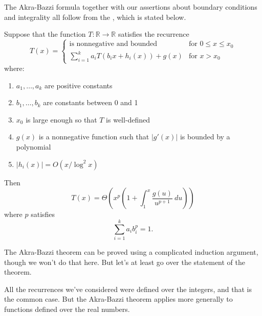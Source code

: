 The Akra-Bazzi formula together with our assertions about boundary
conditions and integrality all follow from the
, which is stated below.

\begin{theorem}
\label{th:akra-bazzi}
Suppose that the function $T: \mathbb{R} \to\mathbb{R}$ satisfies
the recurrence
\begin{equation*}
T(x) =
\begin{cases}
\text{is nonnegative and bounded} & \text{for $0 \leq x \leq x_0$} \\
\sum\limits_{i=1}^k a_i T(b_i x + h_i(x)) + g(x) & \text{for $x > x_0$}
\end{cases}
\end{equation*}
where:
\begin{enumerate}
\item $a_1, \ldots, a_k$ are positive constants
\item $b_1, \ldots, b_k$ are constants between 0 and 1
\item $x_0$ is large enough so that $T$ is well-defined
\item $g(x)$ is a nonnegative function such that $|g'(x)|$ is bounded
by a polynomial
\item $|h_i(x)| = O(x / \log^2 x)$
\end{enumerate}
Then
\begin{equation*}
T(x) = \Theta\left(x^p \left(1 + \int_1^x \frac{g(u)}{u^{p+1}} \
    du\right) \right)
\end{equation*}
where $p$ satisfies
\begin{equation*}
\sum_{i=1}^k {a_i b_i^p} = 1.
\end{equation*}
\end{theorem}

The Akra-Bazzi theorem can be proved using a complicated induction
argument, though we won't do that here.  But let's at least go over
the statement of the theorem.

All the recurrences we've considered were defined over the integers, and
that is the common case.  But the Akra-Bazzi theorem applies more
generally to functions defined over the real numbers.

